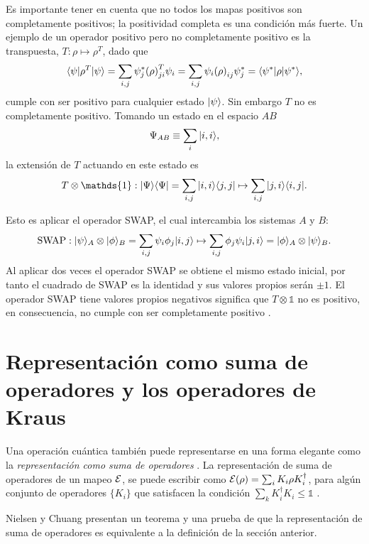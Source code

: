 Es importante tener en cuenta que no todos los mapas positivos son
completamente positivos; la positividad completa es una condición más fuerte.
Un ejemplo de un operador positivo pero no completamente positivo es la
transpuesta, $T:\rho \mapsto {\rho}^T$, dado que \[\langle \psi |{\rho}^T| \psi
\rangle=\sum_{i,j} \psi _j^* {(\rho)}^T _{ji} \psi _i=\sum _{i,j} \psi _i{(\rho)}
_{ij} \psi_j^{*}=\langle {\psi}^*|\rho|\psi ^*\rangle,\] cumple con ser positivo para
cualquier estado $| \psi \rangle$. Sin embargo $ {T} $ no es completamente
positivo. Tomando un estado en el espacio $AB$ \[\Psi_{AB} \equiv \sum_i
|i,i\rangle, \] la extensión de $T$ actuando en este estado es \[T \otimes
\mathds{1}:|\Psi\rala \Psi|=\sum_{i,j}|i,i\rala j,j| \mapsto
\sum_{i,j}|j,i\rala i,j|.\]

Esto es aplicar el operador SWAP, el cual intercambia los sistemas $A$ y $B$:
\begin{equation}
    \text{SWAP}:|\psi\rangle_A\otimes|\phi\rangle_B=\sum_{i,j}\psi_i\phi_j |i,j\rangle\mapsto\sum_{i,j}\phi_j\psi_i|j,i\rangle=|\phi\rangle_A\otimes|\psi\rangle_B.
\end{equation} Al aplicar dos veces el operador SWAP se obtiene el mismo estado inicial, por tanto el cuadrado de SWAP es la identidad y sus valores propios serán $\pm 1$. El operador SWAP tiene valores propios negativos significa que $T \otimes \mathds{1}$ no es positivo, en consecuencia, no cumple con ser completamente positivo  {\cite{preskill2020quantum}}.




\section{Representación como suma de operadores y los operadores de Kraus} %

Una operación cuántica también puede representarse en una forma elegante como
la \textit{representación como suma de operadores}  . La representación de suma
de operadores de un mapeo $\mathcal{E}$, se puede escribir como $\mathcal{E}(\rho)=\sum_i K_i
\rho K_i^\dagger$, para algún conjunto de operadores $\{K_i\}$ que satisfacen
la condición $\sum_k K_i^\dagger K_i\le \mathds{1}$ .

Nielsen y Chuang {\cite{nielsen_chuang_2010}} presentan un teorema y una prueba de que la representación de suma de operadores es equivalente a la definición de la sección anterior.

